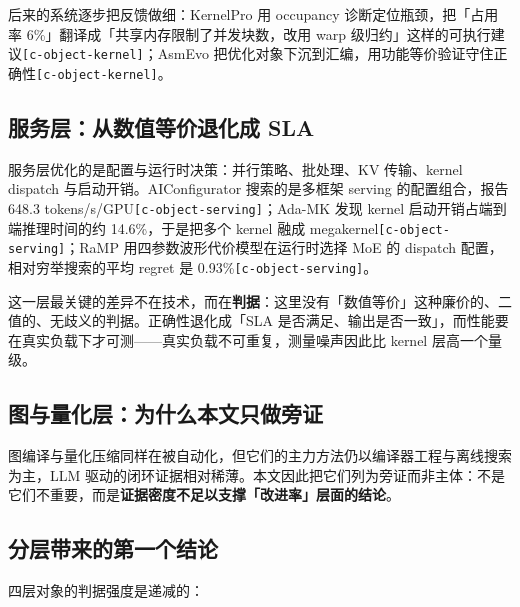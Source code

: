 后来的系统逐步把反馈做细：KernelPro 用 occupancy 诊断定位瓶颈，把「占用率 6\%」翻译成「共享内存限制了并发块数，改用 warp 级归约」这样的可执行建议{\scriptsize\texttt{[c-\hspace{0pt}object-\hspace{0pt}kernel]}}；AsmEvo 把优化对象下沉到汇编，用功能等价验证守住正确性{\scriptsize\texttt{[c-\hspace{0pt}object-\hspace{0pt}kernel]}}。


\subsection{服务层：从数值等价退化成 SLA}

服务层优化的是配置与运行时决策：并行策略、批处理、KV 传输、kernel dispatch 与启动开销。AIConfigurator 搜索的是多框架 serving 的配置组合，报告 648.3 tokens/s/GPU{\scriptsize\texttt{[c-\hspace{0pt}object-\hspace{0pt}serving]}}；Ada-MK 发现 kernel 启动开销占端到端推理时间的约 14.6\%，于是把多个 kernel 融成 megakernel{\scriptsize\texttt{[c-\hspace{0pt}object-\hspace{0pt}serving]}}；RaMP 用四参数波形代价模型在运行时选择 MoE 的 dispatch 配置，相对穷举搜索的平均 regret 是 0.93\%{\scriptsize\texttt{[c-\hspace{0pt}object-\hspace{0pt}serving]}}。


这一层最关键的差异不在技术，而在\textbf{判据}：这里没有「数值等价」这种廉价的、二值的、无歧义的判据。正确性退化成「SLA 是否满足、输出是否一致」，而性能要在真实负载下才可测——真实负载不可重复，测量噪声因此比 kernel 层高一个量级。


\subsection{图与量化层：为什么本文只做旁证}

图编译与量化压缩同样在被自动化，但它们的主力方法仍以编译器工程与离线搜索为主，LLM 驱动的闭环证据相对稀薄。本文因此把它们列为旁证而非主体：不是它们不重要，而是\textbf{证据密度不足以支撑「改进率」层面的结论}。


\subsection{分层带来的第一个结论}

四层对象的判据强度是递减的：


